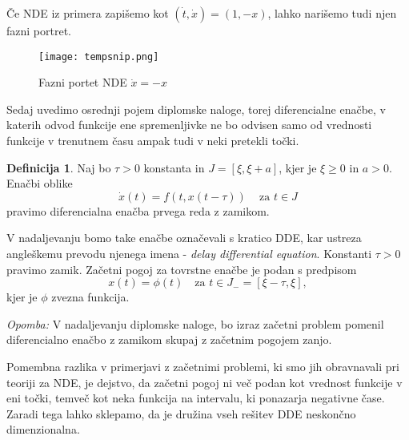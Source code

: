 \documentclass[12pt,a4paper]{amsart}
\theoremstyle{definition} %
\newtheorem{definicija}{Definicija}[section]
\theoremstyle{plain} %
\begin{document}
Če NDE iz primera zapišemo kot $(\dot{t},\dot{x})=(1,-x)$,
lahko narišemo tudi njen fazni portret.
\begin{figure}[h]
    \texttt{[image: tempsnip.png]}
    \caption{Fazni portet NDE $\dot{x} = -x$}
\end{figure}


\newpage

Sedaj uvedimo osrednji pojem diplomske naloge, torej diferencialne enačbe, v 
katerih odvod funkcije ene spremenljivke ne bo odvisen samo od vrednosti funkcije
v trenutnem času ampak tudi v neki pretekli točki. 

\begin{definicija}
    Naj bo $\tau > 0$ konstanta in $J = [\xi,\xi +a]$, kjer je $\xi \geq 0$ in $a > 0$. Enačbi oblike
    \[\dot{x}(t)=f(t,x(t-\tau))\, \quad \text{za } t \in J\]
    pravimo diferencialna enačba prvega reda z zamikom.
\end{definicija}

\noindent V nadaljevanju bomo take enačbe
označevali s kratico DDE, kar ustreza angleškemu prevodu njenega imena - 
\textit{delay dif\mbox{}ferential equation}. Konstanti $\tau>0$ pravimo zamik.
Začetni pogoj za tovrstne enačbe je podan s predpisom
\[x(t)=\phi(t) \quad \text{za } t \in J_{-} = [\xi-\tau,\xi],\]kjer je $\phi$ zvezna funkcija.

\textit{Opomba:} V nadaljevanju diplomske naloge, bo izraz začetni problem pomenil diferencialno enačbo z
zamikom skupaj z začetnim pogojem zanjo.

Pomembna razlika v primerjavi z začetnimi problemi, ki smo jih obravnavali pri teoriji za NDE, je 
dejstvo, da začetni pogoj ni več podan kot vrednost 
funkcije v eni točki, temveč kot neka funkcija na intervalu, ki ponazarja negativne čase. 
Zaradi tega lahko sklepamo, da je družina vseh rešitev DDE neskončno
dimenzionalna.
\end{document}
